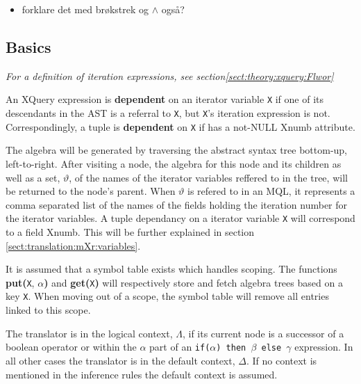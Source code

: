 \begin{itemize}
  \item forklare det med br\o kstrek og $\wedge$ ogs\aa ?
\end{itemize}






\subsection{Basics}
\label{sect:translation:mXr:basics}


\textit{For a definition of iteration expressions, see
section\ref{sect:theory:xquery:Flwor}} 

\begin{myDefinition}
An XQuery expression is \textbf{dependent} on an iterator variable \texttt{X} if one of its descendants in the AST
is a referral to \texttt{X}, but \texttt{X}'s iteration expression is not. Correspondingly, a tuple is
\textbf{dependent} on \texttt{X} if has a not-\textsf{NULL} \textsf{Xnumb} attribute.
\end{myDefinition}

The algebra will be generated by traversing the abstract syntax tree bottom-up, left-to-right. After visiting a
node, the algebra for this node and its children as well as a set, $\vartheta$, of the names of the iterator
variables reffered to in the tree, will be returned to the node's parent. When $\vartheta$ is refered to in an MQL,
it represents a comma separated list of the names of the fields holding the iteration number for the iterator
variables. A tuple dependancy on a iterator variable \texttt{X} will correspond to a field \textsf{Xnumb}. This
will be further explained in section \ref{sect:translation:mXr:variables}.

It is assumed that a symbol table exists which handles scoping. The functions
\textbf{put(}\texttt{X}, $\alpha$\textbf{)} and \textbf{get(}\texttt{X}\textbf{)}
will respectively store and fetch algebra trees based on a key \verb!X!. When
moving out of a scope, the symbol table will remove all entries linked to this scope.

The translator is in the logical context, $\Lambda$, if its current node is a
successor of a boolean operator or within the $\alpha$ part of an
\texttt{if($\alpha$) then $\beta$ else $\gamma$} expression. In all other cases
the translator is in the default context, $\Delta$. If no context is mentioned
in the inference rules the default context is assumed.

